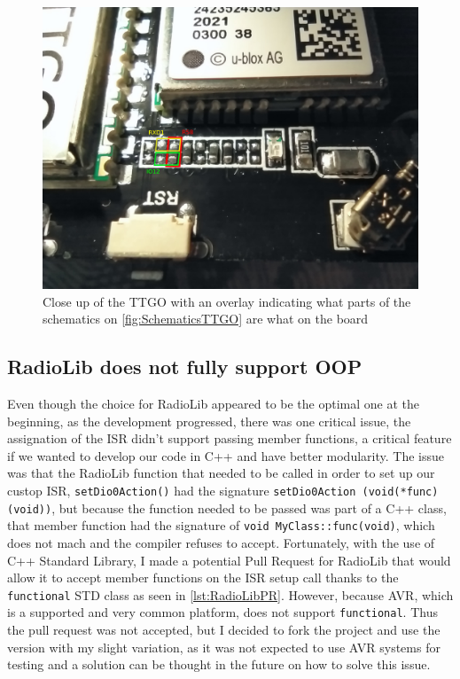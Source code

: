 \begin{figure}[h!]
        \centering
        \includegraphics[width=15cm]{Figures/DebuggerSolution.jpeg}
        \caption{Close up of the TTGO with an overlay indicating what parts of the schematics on \autoref{fig:SchematicsTTGO} are what on the board}
        \label{fig:DebuggerSolutiion}
\end{figure}

\subsection{RadioLib does not fully support OOP}
Even though the choice for RadioLib appeared to be the optimal one at the beginning, as the development progressed, there was one critical issue, the assignation of the ISR didn't support passing member functions, a critical feature if we wanted to develop our code in C++ and have better modularity. The issue was that the RadioLib function that needed to be called in order to set up our custop ISR, \texttt{setDio0Action()} had the signature \texttt{setDio0Action (void(*func)(void))}, but because the function needed to be passed was part of a C++ class, that member function had the signature of \texttt{void MyClass::func(void)}, which does not mach and the compiler refuses to accept. Fortunately, with the use of C++ Standard Library, I made a potential Pull Request for RadioLib that would allow it to accept member functions on the ISR setup call thanks to the \texttt{functional} STD class as seen in \autoref{lst:RadioLibPR}. However, because AVR, which is a supported and very common platform, does not support \texttt{functional}\cite{RadioLibPR}. Thus the pull request was not accepted, but I decided to fork the project and use the version with my slight variation, as it was not expected to use AVR systems for testing and a solution can be thought in the future on how to solve this issue.

